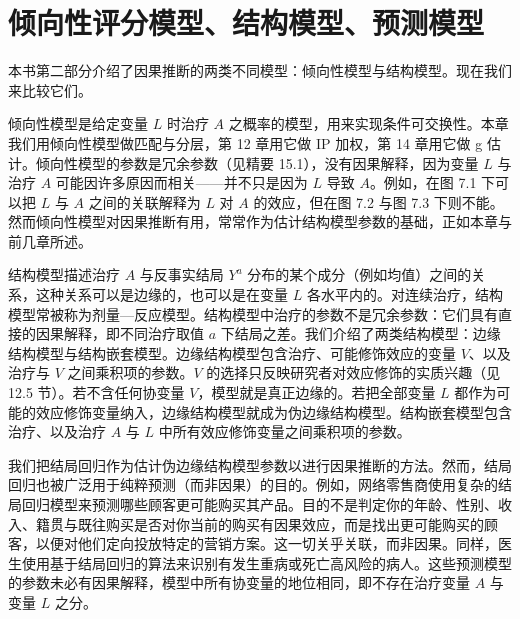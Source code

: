 \begin{figure}[htbp]
\centering
{}
\caption{}
\label{fig:15.2}
\end{figure}

\section{倾向性评分模型、结构模型、预测模型}

本书第二部分介绍了因果推断的两类不同模型：倾向性模型与结构模型。现在我们来比较它们。

倾向性模型是给定变量 $L$ 时治疗 $A$ 之概率的模型，用来实现条件可交换性。本章我们用倾向性模型做匹配与分层，第 12 章用它做 IP 加权，第 14 章用它做 g 估计。倾向性模型的参数是冗余参数（见精要 15.1），没有因果解释，因为变量 $L$ 与治疗 $A$ 可能因许多原因而相关——并不只是因为 $L$ 导致 $A$。例如，在图 7.1 下可以把 $L$ 与 $A$ 之间的关联解释为 $L$ 对 $A$ 的效应，但在图 7.2 与图 7.3 下则不能。然而倾向性模型对因果推断有用，常常作为估计结构模型参数的基础，正如本章与前几章所述。

结构模型描述治疗 $A$ 与反事实结局 $Y^a$ 分布的某个成分（例如均值）之间的关系，这种关系可以是边缘的，也可以是在变量 $L$ 各水平内的。对连续治疗，结构模型常被称为剂量—反应模型。结构模型中治疗的参数不是冗余参数：它们具有直接的因果解释，即不同治疗取值 $a$ 下结局之差。我们介绍了两类结构模型：边缘结构模型与结构嵌套模型。边缘结构模型包含治疗、可能修饰效应的变量 $V$、以及治疗与 $V$ 之间乘积项的参数。$V$ 的选择只反映研究者对效应修饰的实质兴趣（见 12.5 节）。若不含任何协变量 $V$，模型就是真正边缘的。若把全部变量 $L$ 都作为可能的效应修饰变量纳入，边缘结构模型就成为伪边缘结构模型。结构嵌套模型包含治疗、以及治疗 $A$ 与 $L$ 中所有效应修饰变量之间乘积项的参数。

我们把结局回归作为估计伪边缘结构模型参数以进行因果推断的方法。然而，结局回归也被广泛用于纯粹预测（而非因果）的目的。例如，网络零售商使用复杂的结局回归模型来预测哪些顾客更可能购买其产品。目的不是判定你的年龄、性别、收入、籍贯与既往购买是否对你当前的购买有因果效应，而是找出更可能购买的顾客，以便对他们定向投放特定的营销方案。这一切关乎关联，而非因果。同样，医生使用基于结局回归的算法来识别有发生重病或死亡高风险的病人。这些预测模型的参数未必有因果解释，模型中所有协变量的地位相同，即不存在治疗变量 $A$ 与变量 $L$ 之分。

